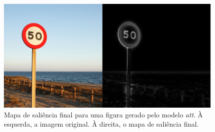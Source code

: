 \documentclass[11pt]{article}
\newcommand{\tit}[1]{\textit{#1}}
\begin{document}
\begin{figure}[H]
\begin{center}
        \includegraphics[width=0.6\linewidth]{img/att.png}
\end{center}
\caption{Mapa de saliência final para uma figura gerado pelo modelo \tit{att}.
    À esquerda, a imagem original. À direita, o mapa de saliência final.}
\label{fig:att}
\end{figure}
\end{document}
